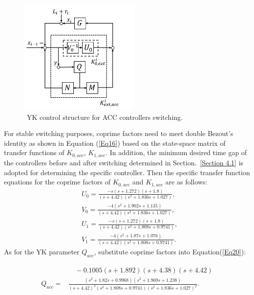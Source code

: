 \documentclass[journal]{IEEEtran}
\begin{document}
\begin{figure}
  \centering
  \includegraphics[width=6cm]{figs/fig6.png}
  \caption{~YK control structure for ACC controllers switching.}
  \label{fig6}
\end{figure}
For stable switching purposes, coprime factors need to meet double Bezout's identity as shown in Equation (\ref{Eq16}) based on the state-space matrix of transfer functions of $K_{0,acc}$, $K_{1,acc}$. In addition, the minimum desired time gap of the controllers before and after switching determined in Section.~\ref{Section 4.1} is adopted for determining the specific controller. Then the specific transfer function equations for the coprime factors of $K_{0,acc}$ and $K_{1,acc}$ are as follows:
\begin{equation}
  \begin{aligned}
     & U_{0}=\frac{-s(s+1.272)(s+1.8)}{(s+4.42)\left(s^{2}+1.836 s+1.027\right)},                 \\
     & V_{0}=\frac{-4\left(s^{2}+1.902 s+1.135\right)}{(s+4.42)\left(s^{2}+1.836 s+1.027\right)}, \\
     & U_{1}=\frac{-s(s+1.272)(s+1.8)}{(s+4.42)\left(s^{2}+1.808 s+0.9741\right)},                \\
     & V_{1}=\frac{-4\left(s^{2}+1.87 s+1.076\right)}{(s+4.42)\left(s^{2}+1.808 s+0.9741\right)}.
  \end{aligned}
\end{equation}
As for the YK parameter $Q_{acc}$, substitute coprime factors into Equation(\ref{Eq20}):

\begin{small}
  \begin{equation}
    \begin{gathered}
      \begin{aligned}
                   & \quad -0.1005(s+1.892)(s+4.38)(s+4.42)                                                                                                                      \\
        Q_{a c c}= & \frac{\left(s^{2}+1.82 s+0.9968\right)\left(s^{2}+1.969 s+1.238\right)}{(s+4.42)^{3}\left(s^{2}+1.808 s+0.9741\right)\left(s^{2}+1.836 s+1.027\right)^{2}}.
      \end{aligned}
    \end{gathered}
  \end{equation}
\end{small}
\end{document}
